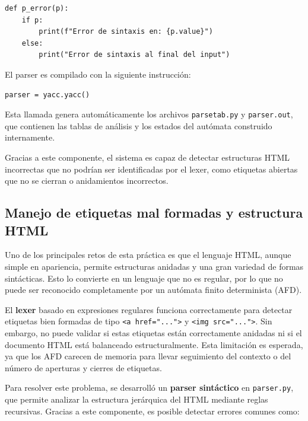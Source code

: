 \documentclass[11pt,a4paper]{article}
\begin{document}
\begin{verbatim}
def p_error(p):
    if p:
        print(f"Error de sintaxis en: {p.value}")
    else:
        print("Error de sintaxis al final del input")
\end{verbatim}

\medskip

El parser es compilado con la siguiente instrucción:

\begin{verbatim}
parser = yacc.yacc()
\end{verbatim}

Esta llamada genera automáticamente los archivos \texttt{parsetab.py} y \texttt{parser.out}, que contienen las tablas de análisis y los estados del autómata construido internamente.

\medskip

Gracias a este componente, el sistema es capaz de detectar estructuras HTML incorrectas que no podrían ser identificadas por el lexer, como etiquetas abiertas que no se cierran o anidamientos incorrectos.

\subsection{Manejo de etiquetas mal formadas y estructura HTML}

Uno de los principales retos de esta práctica es que el lenguaje HTML, aunque simple en apariencia, permite estructuras anidadas y una gran variedad de formas sintácticas. Esto lo convierte en un lenguaje que no es regular, por lo que no puede ser reconocido completamente por un autómata finito determinista (AFD).

\medskip

El \textbf{lexer} basado en expresiones regulares funciona correctamente para detectar etiquetas bien formadas de tipo \texttt{<a href="...">} y \texttt{<img src="...">}. Sin embargo, no puede validar si estas etiquetas están correctamente anidadas ni si el documento HTML está balanceado estructuralmente. Esta limitación es esperada, ya que los AFD carecen de memoria para llevar seguimiento del contexto o del número de aperturas y cierres de etiquetas.

\medskip

Para resolver este problema, se desarrolló un \textbf{parser sintáctico} en \texttt{parser.py}, que permite analizar la estructura jerárquica del HTML mediante reglas recursivas. Gracias a este componente, es posible detectar errores comunes como:
\end{document}
